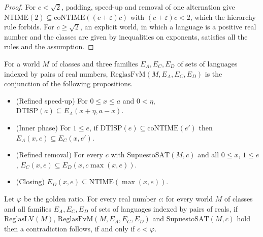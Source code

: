 \begin{proof}
  \leanok
  For $c < \sqrt{2}$, padding, speed-up and removal of one alternation give
  $\mathrm{NTIME}(2) \subseteq \mathrm{coNTIME}((c + \varepsilon) c)$ with $(c+\varepsilon)c < 2$, which
  the hierarchy rule forbids. For $c \ge \sqrt{2}$, an explicit world, in which a language is a
  positive real number and the classes are given by inequalities on exponents, satisfies all the
  rules and the assumption.
\end{proof}

\begin{definition}
  \label{def:search-reglas-fvm}
  \leanok
  For a world $M$ of classes and three families $E_A, E_C, E_D$ of sets of languages indexed by
  pairs of real numbers, $\mathrm{ReglasFvM}(M, E_A, E_C, E_D)$ is the conjunction of the following
  propositions.
  \begin{itemize}
    \item (Refined speed-up) For $0 \le x \le a$ and $0 < \eta$, $\mathrm{DTISP}(a) \subseteq E_A(x + \eta,
      a - x)$.
    \item (Inner phase) For $1 \le e$, if $\mathrm{DTISP}(e) \subseteq \mathrm{coNTIME}(e')$ then
      $E_A(x, e) \subseteq E_C(x, e')$.
    \item (Refined removal) For every $c$ with $\mathrm{SupuestoSAT}(M, c)$ and all $0 \le x$, $1 \le e$,
      $E_C(x, e) \subseteq E_D(x, c \max(x, e))$.
    \item (Closing) $E_D(x, e) \subseteq \mathrm{NTIME}(\max(x, e))$.
  \end{itemize}
\end{definition}

\begin{theorem}
  \label{thm:search-umbral-fvm}
  \leanok
  Let $\varphi$ be the golden ratio. For every real number $c$: for every world $M$ of classes and
  all families $E_A, E_C, E_D$ of sets of languages indexed by pairs of reals, if $\mathrm{ReglasLV}(M)$,
  $\mathrm{ReglasFvM}(M, E_A, E_C, E_D)$ and $\mathrm{SupuestoSAT}(M, c)$ hold then a contradiction
  follows, if and only if $c < \varphi$.
\end{theorem}

